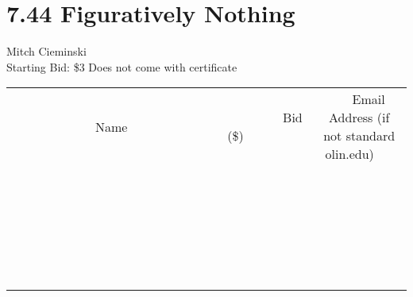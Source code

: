 \documentclass[11pt]{article}
\begin{document}
\section*{7.44 Figuratively Nothing}
Mitch Cieminski
\\
Starting Bid: \$3
\newline
Does not come with certificate
\\[6ex]
\begin{tabular}{c c c}
~~~~~~~~~~~~~Name~~~~~~~~~~~~~ & ~~~~~~~~~Bid (\$)~~~~~~~~~  & ~~~Email Address (if not standard olin.edu)~~~\\
 & & \\
\hline
 & & \\
\hline
 & & \\
\hline
 & & \\
\hline
 & & \\
\hline
 & & \\
\hline
 & & \\
\hline
 & & \\
\hline
 & & \\
\hline
 & & \\
\hline
 & & \\
\hline
 & & \\
\hline
 & & \\
\hline
 & & \\
\hline
 & & \\
\hline
 & & \\
\hline
 & & \\
\hline
 & & \\
\hline
 & & \\
\hline
 & & \\
\hline
 & & \\
\hline
 & & \\
\hline
 & & \\
\hline
 & & \\
\hline
 & & \\
\hline
 & & \\
\hline
\end{tabular}
\newpage
\end{document}
